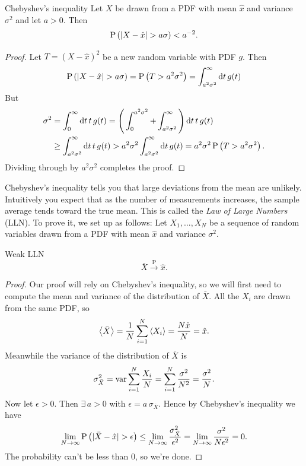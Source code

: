 \begin{theorem}{Chebyshev's inequality}{}
  Let $X$ be drawn from a PDF with mean $\hat{x}$ and variance
  $\sigma^2$ and let $a>0$. Then
  \begin{equation*}
    \pr{|X-\hat{x}|>a\sigma}<a^{-2}.
  \end{equation*}
  \begin{proof}
    Let $T=(X-\hat{x})^2$ be a new random variable with PDF $g$. Then
    \begin{equation*}
      \pr{|X-\hat{x}|>a\sigma}=\pr{T>a^2\sigma^2}
                              =\int_{a^2\sigma^2}^\infty\dd{t}g(t)
    \end{equation*}
    But
    \begin{equation*}
      \begin{aligned}
        \sigma^2&=\int_{0}^\infty\dd{t}t\,g(t)
                =\Bigg(\int_0^{a^2\sigma^2}
                     +\int_{a^2\sigma^2}^\infty\Bigg)\dd{t}t\,g(t)\\
                &\geq\int_{a^2\sigma^2}^\infty\dd{t}t\,g(t)
                >a^2\sigma^2\int_{a^2\sigma^2}^\infty\dd{t}g(t)
                =a^2\sigma^2\operatorname{P}\left(T>a^2\sigma^2\right).
      \end{aligned}
    \end{equation*}
   Dividing through by $a^2\sigma^2$ completes the proof.
  \end{proof} 
\end{theorem}
Chebyshev's inequality tells you that large deviations from the mean are
unlikely. Intuitively you expect that as the number of measurements
increases, the sample average tends toward the true mean. This is
called the {\it Law of Large Numbers} 
(LLN). To prove it, we set up as follows: Let $X_1,...,X_N$ be a sequence 
of random variables drawn from a PDF
with mean $\hat{x}$ and variance $\sigma^2$.
\begin{theorem}{Weak LLN}{}
  $$
    \bar{X}\xrightarrow{\text{P}}\hat{x}.
  $$
  \begin{proof} Our proof will rely on Chebyshev's inequality, so we will
    first need to compute the mean and variance of the distribution of
    $\bar{X}$. All the $X_i$ are drawn from the same PDF, so
    $$
      \ev{\bar{X}}=\frac{1}{N}\sum_{i=1}^N\ev{X_i}
                  =\frac{N\hat{x}}{N}=\hat{x}.
    $$
    Meanwhile the variance of the distribution of $\bar{X}$ is
    $$
      \sigma^2_{\bar{X}}
      =\operatorname{var}\sum_{i=1}^N \frac{X_i}{N}
      =\sum_{i=1}^N\frac{\sigma^2}{N^2}
      =\frac{\sigma^2}{N}.
    $$
    Now let $\epsilon>0$. Then $\exists\,a>0$ with 
    $\epsilon=a\,\sigma_{\bar{X}}$. Hence by Chebyshev's
    inequality we have
    $$
      \lim_{N\to\infty}\pr{|\bar{X}-\hat{x}|>\epsilon}
       \leq\lim_{N\to\infty}\frac{\sigma^2_{\bar{X}}}{\epsilon^2}
       =\lim_{N\to\infty}\frac{\sigma^2}{N\epsilon^2}=0.
    $$
    The probability can't be less than 0, so we're done.
  \end{proof}
\end{theorem}
